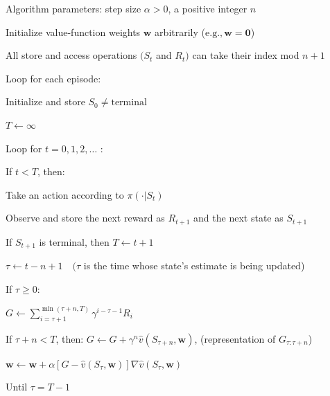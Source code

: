 \documentclass{article}
\begin{document}
Algorithm parameters: step size $\alpha > 0$, a positive integer $n$

Initialize value-function weights $\mathbf{w}$ arbitrarily ($\mathrm { e . g . , } \mathbf { w } = \mathbf { 0 }$)

All store and access operations $( S _ { t }$ and $R _ { t } )$ can take their index mod $n + 1$

Loop for each episode:

\hspace{.5cm} Initialize and store $S _ { 0 } \neq \text{terminal}$

\hspace{.5cm} $T \leftarrow \infty$

\hspace{.5cm} Loop for $t = 0 , 1 , 2 , \ldots$ :

\hspace{1cm} If $t < T$, then:

\hspace{1.5cm} Take an action according to $\pi ( \cdot | S _ { t } )$

\hspace{1.5cm} Observe and store the next reward as $R _ { t + 1 }$ and the next state as $S _ { t + 1 }$

\hspace{1.5cm} If $S _ { t + 1 }$ is terminal, then $T \leftarrow t + 1$

\hspace{1cm} $\tau \leftarrow t - n + 1 \quad ( \tau$ is the time whose state's estimate is being updated)

\hspace{1cm} If $\tau \geq 0$:

\hspace{1.5cm} $G \gets \sum _ { i = \tau + 1 } ^ { \operatorname* { m i n } ( \tau + n , T ) } \gamma ^ { i - \tau - 1 } R _ { i }$

\hspace{1.5cm} If $\tau + n < T$, then: $G \gets G + \gamma ^ { n } \hat { v } ( S _ { \tau + n } \mathbf { , } \mathbf { w } )$, (representation of $G _ { \tau : \tau + n }$)

\hspace{1.5cm} $\mathbf { w } \leftarrow \mathbf { w } + \alpha \left[ G - \hat { v } ( S _ { \tau } \mathbf { , } \mathbf { w } ) \right] \nabla \hat { v } ( S _ { \tau } \mathbf { , } \mathbf { w } )$

\hspace{.5cm} Until $\tau = T - 1$
\end{document}
